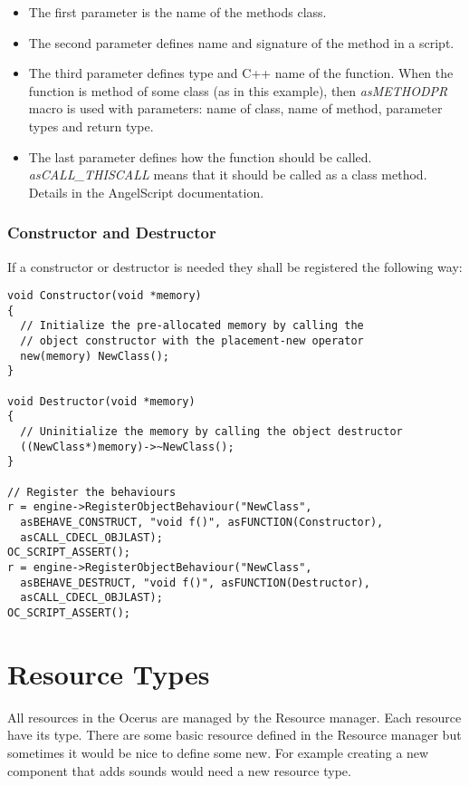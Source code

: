 \documentclass[a4paper, 12pt]{report}
\begin{document}
\begin{itemize}
\item
The first parameter is the name of the methods class.
\item
The second parameter defines name and signature of the method in a script.
\item
The third parameter defines type and C++ name of the function. When the function is method of some class (as in this example), then \emph{asMETHODPR} macro is used with parameters: name of class, name of method, parameter types and return type.
\item
The last parameter defines how the function should be called. \emph{asCALL\_THISCALL} means that it should be called as a class method. Details in the AngelScript documentation.
\end{itemize}

\subsection{Constructor and Destructor}

If a constructor or destructor is needed they shall be registered the following way:

\begin{verbatim}
void Constructor(void *memory)
{
  // Initialize the pre-allocated memory by calling the
  // object constructor with the placement-new operator
  new(memory) NewClass();
}

void Destructor(void *memory)
{
  // Uninitialize the memory by calling the object destructor
  ((NewClass*)memory)->~NewClass();
}

// Register the behaviours
r = engine->RegisterObjectBehaviour("NewClass",
  asBEHAVE_CONSTRUCT, "void f()", asFUNCTION(Constructor),
  asCALL_CDECL_OBJLAST);
OC_SCRIPT_ASSERT();
r = engine->RegisterObjectBehaviour("NewClass",
  asBEHAVE_DESTRUCT, "void f()", asFUNCTION(Destructor),
  asCALL_CDECL_OBJLAST);
OC_SCRIPT_ASSERT();

\end{verbatim}


\chapter{Resource Types}

All resources in the Ocerus are managed by the Resource manager. Each resource have its type. There are some basic resource defined in the Resource manager but sometimes it would be nice to define some new. For example creating a new component that adds sounds would need a new resource type.
\end{document}
